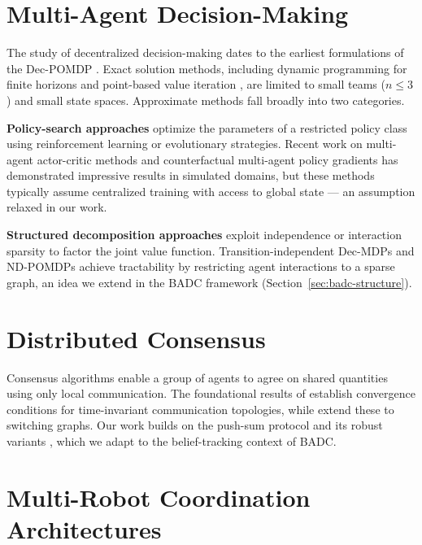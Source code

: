 \documentclass[12pt,oneside]{report}
\theoremstyle{definition}
\theoremstyle{remark}
\begin{document}
\section{Multi-Agent Decision-Making}

The study of decentralized decision-making dates to the earliest formulations
of the Dec-POMDP \citep{bernstein2002complexity}. Exact solution methods,
including dynamic programming for finite horizons \citep{hansen2004dynamic}
and point-based value iteration \citep{spaan2005perseus}, are limited to
small teams ($n \leq 3$) and small state spaces. Approximate methods fall
broadly into two categories.

\textbf{Policy-search approaches} optimize the parameters of a restricted
policy class using reinforcement learning or evolutionary strategies.
Recent work on multi-agent actor-critic methods \citep{lowe2017maddpg} and
counterfactual multi-agent policy gradients \citep{foerster2018counterfactual}
has demonstrated impressive results in simulated domains, but these methods
typically assume centralized training with access to global state --- an
assumption relaxed in our work.

\textbf{Structured decomposition approaches} exploit independence or
interaction sparsity to factor the joint value function. Transition-independent
Dec-MDPs \citep{becker2004transition} and ND-POMDPs
\citep{nair2005networked} achieve tractability by restricting agent
interactions to a sparse graph, an idea we extend in the BADC framework
(Section~\ref{sec:badc-structure}).

\section{Distributed Consensus}

Consensus algorithms enable a group of agents to agree on shared quantities
using only local communication. The foundational results of
\citet{olfati2007consensus} establish convergence conditions for
time-invariant communication topologies, while \citet{ren2005consensus}
extend these to switching graphs. Our work builds on the push-sum protocol
\citep{kempe2003gossip} and its robust variants \citep{hadjicostis2017average},
which we adapt to the belief-tracking context of BADC.

\section{Multi-Robot Coordination Architectures}
\end{document}
